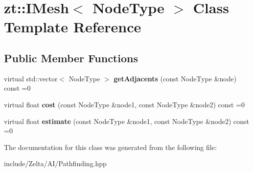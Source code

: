 \hypertarget{classzt_1_1_i_mesh}{}\section{zt\+:\+:I\+Mesh$<$ Node\+Type $>$ Class Template Reference}
\label{classzt_1_1_i_mesh}
\subsection*{Public Member Functions}
\begin{DoxyCompactItemize}
\item 
\mbox{\label{classzt_1_1_i_mesh_a88bfc73418c80edbdd6fc4027448a47c}} 
virtual std\+::vector$<$ Node\+Type $>$ {\bfseries get\+Adjacents} (const Node\+Type \&node) const =0
\item 
\mbox{\label{classzt_1_1_i_mesh_a80e2dffb3dfd54075cb4ac9372ceeb96}} 
virtual float {\bfseries cost} (const Node\+Type \&node1, const Node\+Type \&node2) const =0
\item 
\mbox{\label{classzt_1_1_i_mesh_a4a6d526ba6f809e0e6ab6df8549754c7}} 
virtual float {\bfseries estimate} (const Node\+Type \&node1, const Node\+Type \&node2) const =0
\end{DoxyCompactItemize}


The documentation for this class was generated from the following file\+:\begin{DoxyCompactItemize}
\item 
include/\+Zelta/\+A\+I/Pathfinding.\+hpp\end{DoxyCompactItemize}
